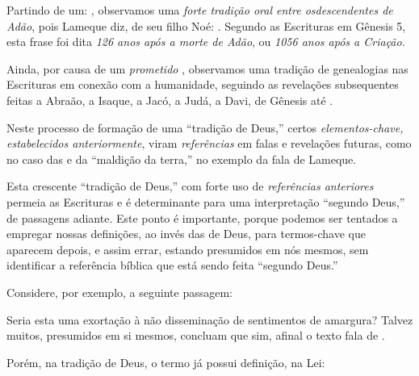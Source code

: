     Partindo de um: , observamos uma \emph{forte tradição oral entre osdescendentes de Adão}, pois  Lameque  diz,
    de seu filho Noé: . Segundo as Escrituras em Gênesis 5, esta frase foi dita \emph{126
    anos após a morte de Adão}, ou \emph{1056 anos após a Criação}.

    Ainda, por causa de um \emph{prometido} ,  observamos  uma  tradição  de
    genealogias nas Escrituras em conexão com a humanidade, seguindo as revelações subsequentes feitas a  Abraão,  a  Isaque,  a
    Jacó, a Judá, a Davi, de Gênesis até .

    Neste processo de formação de uma ``tradição de Deus,'' certos \emph{elementos-chave,  estabelecidos  anteriormente},  viram
    \emph{referências} em falas e revelações futuras, como no caso das  e da ``maldição da terra,''  no  exemplo
    da fala de Lameque.

    Esta crescente ``tradição de Deus,'' com forte uso de \emph{referências anteriores} permeia as Escrituras e  é  determinante
    para uma interpretação ``segundo Deus,'' de passagens adiante. Este ponto  é  importante,  porque  podemos  ser  tentados  a
    empregar nossas definições, ao invés das de Deus, para termos-chave que aparecem depois, e assim errar,  estando  presumidos
    em nós mesmos, sem identificar a referência bíblica que está sendo feita ``segundo Deus.''

    Considere, por exemplo, a seguinte passagem:


    Seria esta uma exortação à não disseminação de sentimentos de amargura? Talvez muitos, presumidos em si mesmos, concluam que
    sim, afinal o texto fala de .

    Porém, na tradição de Deus, o termo já possui definição, na Lei:

